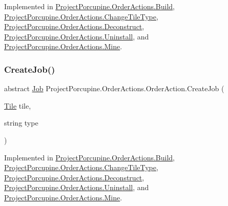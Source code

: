 Implemented in \hyperlink{class_project_porcupine_1_1_order_actions_1_1_build_af00322a255be2f3913556c114bead18e}{Project\+Porcupine.\+Order\+Actions.\+Build}, \hyperlink{class_project_porcupine_1_1_order_actions_1_1_change_tile_type_a6eabfaa08b85dfbed31c79a53f5d65f3}{Project\+Porcupine.\+Order\+Actions.\+Change\+Tile\+Type}, \hyperlink{class_project_porcupine_1_1_order_actions_1_1_deconstruct_aa769294eedaf91d184ec166705181a8a}{Project\+Porcupine.\+Order\+Actions.\+Deconstruct}, \hyperlink{class_project_porcupine_1_1_order_actions_1_1_uninstall_a2608888052c16ab5e453408ca28a7bf1}{Project\+Porcupine.\+Order\+Actions.\+Uninstall}, and \hyperlink{class_project_porcupine_1_1_order_actions_1_1_mine_a8c32c9b50a98edd3db04182f1e3c5b53}{Project\+Porcupine.\+Order\+Actions.\+Mine}.

\mbox{\label{class_project_porcupine_1_1_order_actions_1_1_order_action_a84f0d2817e07e351c4a9e86172d8f5b4}} 
\subsubsection{\texorpdfstring{Create\+Job()}{CreateJob()}}
{\footnotesize\ttfamily abstract \hyperlink{class_job}{Job} Project\+Porcupine.\+Order\+Actions.\+Order\+Action.\+Create\+Job (\begin{DoxyParamCaption}\item[{\hyperlink{class_tile}{Tile}}]{tile,  }\item[{string}]{type }\end{DoxyParamCaption})\hspace{0.3cm}{\ttfamily [pure virtual]}}



Implemented in \hyperlink{class_project_porcupine_1_1_order_actions_1_1_build_add124f7d8c0cea6ce9c408a4c7d4c284}{Project\+Porcupine.\+Order\+Actions.\+Build}, \hyperlink{class_project_porcupine_1_1_order_actions_1_1_change_tile_type_aa8d1da1aa2599aa6abe5e1c57c541c92}{Project\+Porcupine.\+Order\+Actions.\+Change\+Tile\+Type}, \hyperlink{class_project_porcupine_1_1_order_actions_1_1_deconstruct_a7f242b2767ac56ef47c07f04b3c86d2a}{Project\+Porcupine.\+Order\+Actions.\+Deconstruct}, \hyperlink{class_project_porcupine_1_1_order_actions_1_1_uninstall_a24d59eabcb853fd7b3e84ba1c10568fc}{Project\+Porcupine.\+Order\+Actions.\+Uninstall}, and \hyperlink{class_project_porcupine_1_1_order_actions_1_1_mine_a77884a273e799b5203fecbb68884bf13}{Project\+Porcupine.\+Order\+Actions.\+Mine}.

